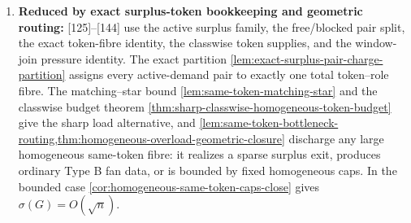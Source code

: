 \documentclass[11pt]{article}
\begin{document}
\begin{enumerate}[label=\arabic*., leftmargin=1.8em]
\item \textbf{Reduced by exact surplus-token bookkeeping and geometric routing:} {[125]}--{[144]} use the active surplus family, the free/blocked pair split, the exact token-fibre identity, the classwise token supplies, and the window-join pressure identity.  The exact partition \cref{lem:exact-surplus-pair-charge-partition} assigns every active-demand pair to exactly one total token--role fibre.  The matching--star bound \cref{lem:same-token-matching-star} and the classwise budget theorem \cref{thm:sharp-classwise-homogeneous-token-budget} give the sharp load alternative, and \cref{lem:same-token-bottleneck-routing,thm:homogeneous-overload-geometric-closure} discharge any large homogeneous same-token fibre: it realizes a sparse surplus exit, produces ordinary Type B fan data, or is bounded by fixed homogeneous caps.  In the bounded case \cref{cor:homogeneous-same-token-caps-close} gives \(\sigma(G)=O(\sqrt n)\).
\end{enumerate}
\end{document}
